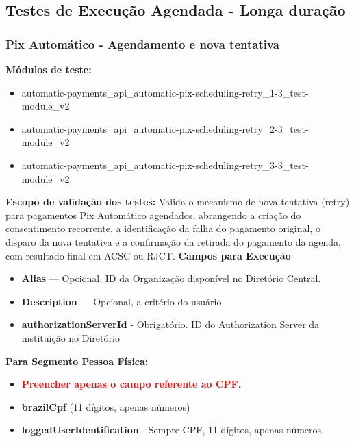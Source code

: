 \subsection{Testes de Execução Agendada - Longa duração}

\subsubsection{Pix Automático - Agendamento e nova tentativa}

\textbf{Módulos de teste:}

\begin{itemize}
    \item automatic-payments\_api\_automatic-pix-scheduling-retry\_1-3\_test-module\_v2
    \item automatic-payments\_api\_automatic-pix-scheduling-retry\_2-3\_test-module\_v2
    \item automatic-payments\_api\_automatic-pix-scheduling-retry\_3-3\_test-module\_v2
\end{itemize}
\medskip
\textbf{Escopo de validação dos testes:}
\medskip
Valida o mecanismo de nova tentativa (retry) para pagamentos Pix Automático agendados, abrangendo a criação do consentimento recorrente, a identificação da falha do pagamento original, o disparo da nova tentativa e a confirmação da retirada do pagamento da agenda, com resultado final em ACSC ou RJCT.
\medskip
\textbf{Campos para Execução}

\begin{itemize}
    \item \textbf{Alias} — Opcional. ID da Organização disponível no Diretório Central.
    \item \textbf{Description} — Opcional, a critério do usuário.
    \item \textbf{\textcolor{red!80}{authorizationServerId}} - Obrigatório. ID do Authorization Server da instituição no Diretório
\end{itemize}

\textbf{Para Segmento Pessoa Física:}
\begin{itemize}
    \item \textbf{\textcolor{red}{Preencher apenas o campo referente ao CPF.}}
    \item \textbf{\textcolor{red!80}{brazilCpf}} (11 dígitos, apenas números)
    \item \textbf{\textcolor{red!80}{loggedUserIdentification}} - Sempre CPF, 11 dígitos, apenas números.
\end{itemize}

